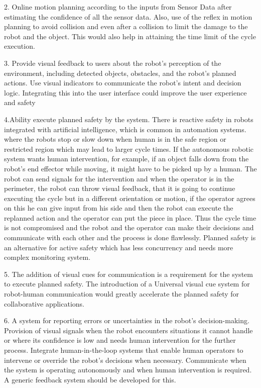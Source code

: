 {2. Online motion planning according to the inputs from Sensor Data after estimating the confidence of all the sensor data. Also, use of the reflex in motion planning to avoid collision and even after a collision to limit the damage to the robot and the object. This would also help in attaining the time limit of the cycle execution.

3. Provide visual feedback to users about the robot's perception of the environment, including detected objects, obstacles, and the robot's planned actions. Use visual indicators to communicate the robot's intent and decision logic. Integrating this into the user interface could improve the user experience and safety

4.Ability execute planned safety\cite{author35} by the system. There is reactive safety in robots integrated with artificial intelligence, which is common in automation systems. where the robots stop or slow down when human is in the safe region or restricted region which may lead to larger cycle times. If the autonomous robotic system wants human intervention, for example, if an object falls down from the robot's end effector while moving, it might have to be picked up by a human. The robot can send signals for the intervention and when the operator is in the perimeter, the robot can throw visual feedback, that it is going to continue executing the cycle but in a different orientation or motion, if the operator agrees on this he can give input from his side and then the robot can execute the replanned action and the operator can put the piece in place. Thus the cycle time is not compromised and the robot and the operator can make their decisions and communicate with each other and the process is done flawlessly. Planned safety is an alternative for active safety which has less concurrency and needs more complex monitoring system.

5. The addition of visual cues for communication is a requirement for the system to execute planned safety. The introduction of a Universal visual cue system for robot-human communication would greatly accelerate the planned safety for collaborative applications.

6. A system for reporting errors or uncertainties in the robot's decision-making.
Provision of visual signals when the robot encounters situations it cannot handle or where its confidence is low and needs human intervention for the further process.  Integrate human-in-the-loop systems that enable human operators to intervene or override the robot's decisions when necessary. Communicate when the system is operating autonomously and when human intervention is required. A generic feedback system should be developed for this.

}
